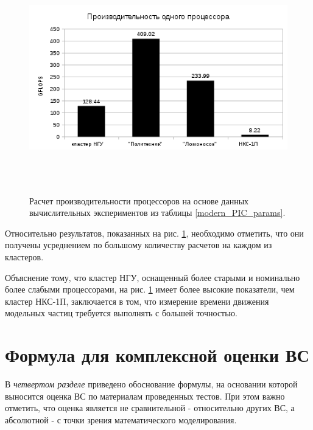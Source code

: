 \begin{figure}[htb]
	\begin{center}
		\includegraphics[height=10cm,keepaspectratio]{images/modern_PIC_params_FLOPS_new.png}
	\end{center}
	\caption{Расчет производительности процессоров на основе данных вычислительных экспериментов из таблицы \ref{modern_PIC_params}. }
	\label{xi_flops}
\end{figure} 
Относительно результатов, показанных на рис. \ref{xi_flops}, необходимо отметить, что они получены усреднением по большому количеству расчетов на каждом из кластеров. 

Объяснение тому, что кластер НГУ, оснащенный более старыми и номинально более слабыми процессорами, на рис. \ref{xi_flops} имеет более высокие показатели, чем кластер НКС-1П, заключается в том, что измерение времени движения модельных частиц требуется выполнять с большей точностью.

\clearpage








\section{Формула для комплексной оценки ВС}
\label{complex_evaluation}
В \textit{четвертом разделе} приведено обоснование формулы, на основании которой выносится оценка ВС по материалам проведенных тестов. При этом важно отметить, что оценка является не сравнительной - относительно других ВС, а абсолютной - с точки зрения математического моделирования. 

